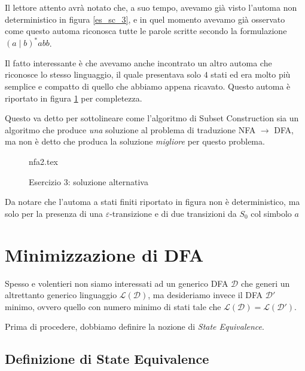 \documentclass[class=book, crop=false, oneside, 12pt]{standalone}
\begin{document}
Il lettore attento avrà notato che, a suo tempo, avevamo già visto l'automa non deterministico in figura \ref{es_sc_3}, e in quel momento avevamo già osservato come questo automa riconosca tutte le parole scritte secondo la formulazione \((a \mid b)^* abb\).

Il fatto interessante è che avevamo anche incontrato un altro automa che riconosce lo stesso linguaggio, il quale presentava solo \(4\) stati ed era molto più semplice e compatto di quello che abbiamo appena ricavato. Questo automa è riportato in figura \ref{sol_sc_3_v2} per completezza.

Questo va detto per sottolineare come l'algoritmo di Subset Construction sia un algoritmo che produce \emph{una} soluzione al problema di traduzione NFA \(\to\) DFA, ma non è detto che produca la soluzione \emph{migliore} per questo problema.

\begin{figure}[H]
    \centering
    {nfa2.tex}
    \caption{Esercizio 3: soluzione alternativa}
    \label{sol_sc_3_v2}
\end{figure}

Da notare che l'automa a stati finiti riportato in figura non è deterministico, ma solo per la presenza di una \(\varepsilon\)-transizione e di due transizioni da \(S_{0}\) col simbolo \(a\)

\section{Minimizzazione di DFA}
Spesso e volentieri non siamo interessati ad un generico DFA \(\mathcal{D}\) che generi un altrettanto generico linguaggio \(\mathcal{L(D)}\), ma desideriamo invece il DFA \(\mathcal{D}'\) minimo, ovvero quello con numero minimo di stati tale che \(\mathcal{L(D)} = \mathcal{L(D')}\). 


Prima di procedere, dobbiamo definire la nozione di \emph{State Equivalence}.

\subsection{Definizione di State Equivalence}
\end{document}
